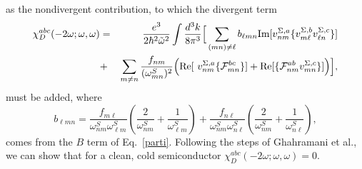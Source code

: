 \documentclass[floatfix,prb,aps,superscriptaddress,11pt]{revtex4}
\begin{document}
as the nondivergent contribution, to which the divergent term 
\begin{eqnarray*}
\chi _{D}^{abc}(-2\omega;\omega,\omega) &=&\frac{e^{3}}{2\hbar ^{2}\tilde\omega^{2}}\int 
\frac{d^{3}k}{8\pi ^{3}}\Big[\sum_{(mn)\neq\ell}b_{\ell mn}\mbox{Im}\lbrack
v_{nm}^{\Sigma ,a}\{v_{m\ell }^{\Sigma ,b}v_{\ell n}^{\Sigma ,c}\}]  \notag
\label{chi2d} \\
&+&\sum_{m\neq n}\frac{f_{nm}}{(\omega_{mn}^{S})^{2}}\Big(\mbox{Re}\lbrack \
v_{nm}^{\Sigma ,a}\{\mathcal{F}_{mn}^{bc}\}]+\mbox{Re}\lbrack \{\mathcal{F}
_{nm}^{ab}v_{mn}^{\Sigma ,c}\}]\Big)\Big],
\end{eqnarray*}
must be added, where 
\begin{equation*}
b_{\ell mn}=\frac{f_{m\ell }}{\omega_{nm}^{S}\omega_{\ell m}^{S}}\left( \frac{2}{
\omega_{nm}^{S}}+\frac{1}{\omega_{\ell m}^{S}}\right) +\frac{f_{n\ell }}{\omega
_{nm}^{S}\omega_{n\ell }^{S}}\left( \frac{2}{\omega_{nm}^{S}}+\frac{1}{\omega_{n\ell
}^{S}}\right) ,
\end{equation*}
comes from the $B$ term of Eq.~\eqref{parti}. Following the steps of
Ghahramani et al.,\cite{ghahramaniPRB91} we can show that for
a clean, cold semiconductor $\chi _{D}^{abc}(-2\omega;\omega,\omega)=0$.\cite{cabellostesis}
\end{document}
